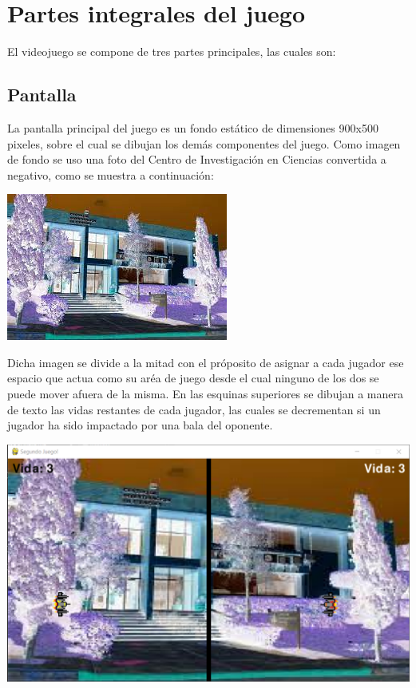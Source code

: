 \documentclass[12pt,letterpaper]{report}
\begin{document}
\section{Partes integrales del juego}
El videojuego se compone de tres partes principales, las cuales son:

\subsection{Pantalla}
La pantalla principal del juego es un fondo estático de dimensiones 900x500 pixeles, sobre el cual se dibujan los demás componentes del juego. Como imagen de fondo se uso una foto del Centro de Investigación en Ciencias convertida a negativo, como se muestra a continuación:
\begin{center}
\includegraphics[scale=0.5]{negative_cinc.png} 
\end{center} 
Dicha imagen se divide a la mitad con el próposito de asignar a cada jugador ese espacio que actua como su aréa de juego desde el cual ninguno de los dos se puede mover afuera de la misma.\newline
En las esquinas superiores se dibujan a manera de texto las vidas restantes de cada jugador, las cuales se decrementan si un jugador ha sido impactado por una bala del oponente.
\begin{center}
\includegraphics[scale=0.75]{execute_order_66.png} 
\end{center}
\end{document}
